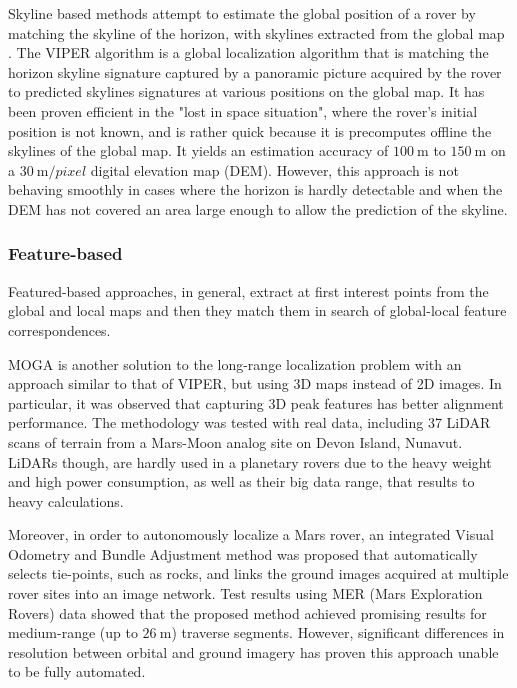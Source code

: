 Skyline based methods attempt to estimate the global position of a rover
by matching the skyline of the horizon, with skylines extracted from
the global map \parencite{Stein1992} \parencite{Cozman1997}.
The VIPER algorithm \parencite{Cozman2000} is a global localization
algorithm that is matching the horizon skyline signature captured by a
panoramic picture acquired by the rover to predicted skylines signatures
at various positions on the global map.
It has been proven efficient in the "lost in space situation",
where the rover's initial position is not known, and is rather quick because
it is precomputes offline the skylines of the global map.
It yields an estimation accuracy of $\SI{100}{\m}$ to $\SI{150}{\m}$ on a
$\SI{30}{\m \per pixel}$ digital elevation map (DEM).
However, this approach is not behaving smoothly in cases where the horizon
is hardly detectable and when the DEM has not covered an area large enough
to allow the prediction of the skyline.

\subsubsection{Feature-based}

Featured-based approaches, in general, extract at first interest points
from the global and local maps and then they match them in search of
global-local feature correspondences.

MOGA \parencite{Carle2010} is another solution to the long-range localization
problem with an approach similar to that of VIPER, but using 3D maps
instead of 2D images.
In particular, it was observed that capturing 3D peak features has
better alignment performance.
The methodology was tested with real data, including 37 LiDAR scans of
terrain from a Mars-Moon analog site on Devon Island, Nunavut.
LiDARs though, are hardly used in a planetary rovers due to the heavy
weight and high power consumption, as well as their big data range,
that results to heavy calculations.

Moreover, in order to autonomously localize a Mars rover,
an integrated Visual Odometry and Bundle Adjustment method \parencite{Li2007}
was proposed that automatically selects tie-points, such as rocks,
and links the ground images acquired at multiple rover sites into
an image network.
Test results using MER (Mars Exploration Rovers) data showed that the
proposed method achieved promising results for medium-range (up to
$\SI{26}{\m}$) traverse segments.
However, significant differences in resolution between orbital and
ground imagery has proven this approach unable to be fully automated.

